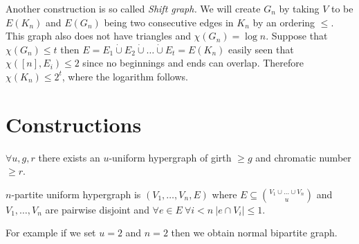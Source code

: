 \begin{example}
	Another construction is so called \textit{Shift graph.} We will create $G_n$ by taking $V$ to be $E(K_n)$ and $E(G_n)$ being two consecutive edges in $K_n$ by an ordering $\leq$. This graph also does not have triangles and $\chi(G_n) = \log n$. Suppose that $\chi(G_n) \leq t$ then $E = E_1 \dot\cup E_2 \dot\cup \dots \dot\cup E_t = E(K_n)$ easily seen that $\chi([n], E_i) \leq 2$ since no beginnings and ends can overlap. Therefore $\chi(K_n) \leq 2^t$, where the logarithm follows.
\end{example}

\section{Constructions}

\begin{thm}
	$\forall u,g,r$ there exists an $u$-uniform hypergraph of girth $\geq g$ and chromatic number $\geq r$.
\end{thm}

\begin{defn}
	$n$-partite uniform hypergraph is $(V_1, \dots, V_n, E)$ where $E \subseteq \binom{V_1 \cup \dots \cup V_n}{u}$ and $V_1, \dots, V_n$ are pairwise disjoint and $\forall e \in E \ \forall i < n \ |e \cap V_i| \leq 1$. 
\end{defn}

\begin{example}
	For example if we set $u = 2$ and $n = 2$ then we obtain normal bipartite graph.
\end{example}

